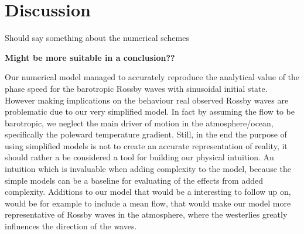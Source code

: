 \section{Discussion}
Should say something about the numerical schemes 

\textbf{Might be more suitable in a conclusion??}

Our numerical model managed to accurately reproduce the analytical value of the  phase speed
for the barotropic Rossby waves with sinusoidal initial state. However making
implications on the behaviour real 
observed Rossby waves are problematic due to our very simplified model. In fact
by assuming the flow to be barotropic, we neglect the main driver of
motion in the atmosphere/ocean, specifically the poleward
temperature gradient. Still, in the end the purpose of using simplified models
is not to create an accurate representation of reality, it should rather a be
considered a tool for building our physical intuition. An intuition which
is invaluable when adding complexity to the model, because the simple models can
be a baseline for evaluating of the effects from added complexity.
Additions to our model that would be a interesting to follow up on, would be for
example to include a mean flow, that would make our model more representative of
Rossby waves in the atmosphere, where the westerlies greatly influences the
direction of the waves.  